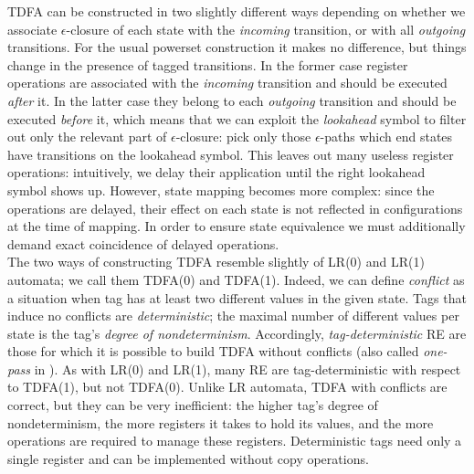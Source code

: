 \documentclass{article}
\theoremstyle{definition}
\begin{document}
\begin{multicols}{2}
TDFA can be constructed in two slightly different ways
depending on whether we associate $\epsilon$-closure of each state with the \emph{incoming} transition,
or with all \emph{outgoing} transitions.
For the usual powerset construction it makes no difference, but things change in the presence of tagged transitions.
In the former case register operations are associated with the \emph{incoming} transition and should be executed \emph{after} it.
In the latter case they belong to each \emph{outgoing} transition and should be executed \emph{before} it,
which means that we can exploit the \emph{lookahead} symbol to filter out only the relevant part of $\epsilon$-closure:
pick only those $\epsilon$-paths which end states have transitions on the lookahead symbol.
This leaves out many useless register operations:
intuitively, we delay their application until the right lookahead symbol shows up.
However, state mapping becomes more complex:
since the operations are delayed,
their effect on each state is not reflected in configurations at the time of mapping.
In order to ensure state equivalence we must additionally demand exact coincidence of delayed operations.
\\

The two ways of constructing TDFA resemble slightly of LR(0) and LR(1) automata; we call them TDFA(0) and TDFA(1).
Indeed, we can define \emph{conflict} as a situation when tag has at least two different values in the given state.
Tags that induce no conflicts are \emph{deterministic};
the maximal number of different values per state is the tag's \emph{degree of nondeterminism}.
Accordingly, \emph{tag-deterministic} RE are those for which it is possible to build TDFA without conflicts
(also called \emph{one-pass} in \cite{Cox10}).
As with LR(0) and LR(1), many RE are tag-deterministic with respect to TDFA(1), but not TDFA(0).
Unlike LR automata, TDFA with conflicts are correct, but they can be very inefficient:
the higher tag's degree of nondeterminism, the more registers it takes to hold its values,
and the more operations are required to manage these registers.
Deterministic tags need only a single register and can be implemented without copy operations.
\\


\end{multicols}
\end{document}
